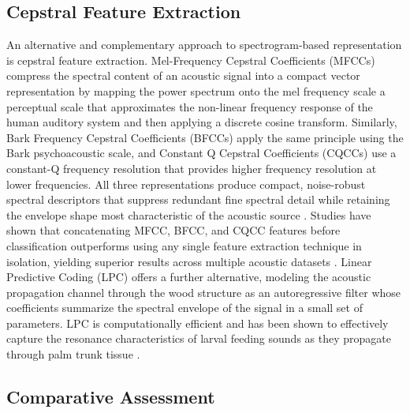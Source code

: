 \documentclass[12pt,a4paper,oneside]{memoir}
\begin{document}
\subsection{Cepstral Feature Extraction}

An alternative and complementary approach to spectrogram-based representation is cepstral feature extraction. Mel-Frequency Cepstral Coefficients (MFCCs) compress the spectral content of an acoustic signal into a compact vector representation by mapping the power spectrum onto the mel frequency scale a perceptual scale that approximates the non-linear frequency response of the human auditory system and then applying a discrete cosine transform. Similarly, Bark Frequency Cepstral Coefficients (BFCCs) apply the same principle using the Bark psychoacoustic scale, and Constant Q Cepstral Coefficients (CQCCs) use a constant-Q frequency resolution that provides higher frequency resolution at lower frequencies. All three representations produce compact, noise-robust spectral descriptors that suppress redundant fine spectral detail while retaining the envelope shape most characteristic of the acoustic source \cite{pinhas2008,rach2013,boulila2023}. Studies have shown that concatenating MFCC, BFCC, and CQCC features before classification outperforms using any single feature extraction technique in isolation, yielding superior results across multiple acoustic datasets \cite{boulila2023}. Linear Predictive Coding (LPC) offers a further alternative, modeling the acoustic propagation channel through the wood structure as an autoregressive filter whose coefficients summarize the spectral envelope of the signal in a small set of parameters. LPC is computationally efficient and has been shown to effectively capture the resonance characteristics of larval feeding sounds as they propagate through palm trunk tissue \cite{saranya2025}.

\subsection{Comparative Assessment}
\end{document}
